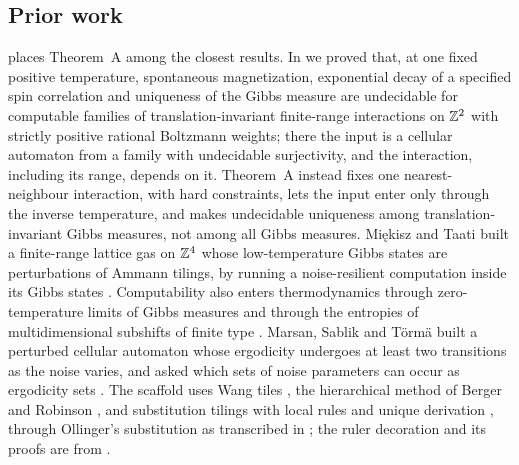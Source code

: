 \subsection{Prior work}

 places Theorem~A among the closest results. In \cite{DM26thermal} we proved that, at one fixed positive temperature, spontaneous magnetization, exponential decay of a specified spin correlation and uniqueness of the Gibbs measure are undecidable for computable families of translation-invariant finite-range interactions on $\mathbb{Z}^2$ with strictly positive rational Boltzmann weights; there the input is a cellular automaton from a family with undecidable surjectivity, and the interaction, including its range, depends on it. Theorem~A instead fixes one nearest-neighbour interaction, with hard constraints, lets the input enter only through the inverse temperature, and makes undecidable uniqueness among translation-invariant Gibbs measures, not among all Gibbs measures. Mi\k{e}kisz and Taati built a finite-range lattice gas on $\mathbb{Z}^4$ whose low-temperature Gibbs states are perturbations of Ammann tilings, by running a noise-resilient computation inside its Gibbs states \cite{TaatiMiekisz26}. Computability also enters thermodynamics through zero-temperature limits of Gibbs measures \cite{ChazottesHochman10} and through the entropies of multidimensional subshifts of finite type \cite{HochmanMeyerovitch10}. Marsan, Sablik and T\"orm\"a built a perturbed cellular automaton whose ergodicity undergoes at least two transitions as the noise varies, and asked which sets of noise parameters can occur as ergodicity sets \cite{MarsanSablikTorma26}. The scaffold uses Wang tiles \cite{Wang61}, the hierarchical method of Berger \cite{Berger66} and Robinson \cite{Robinson71}, and substitution tilings with local rules and unique derivation \cite{Mozes89,Mosse92,Solomyak98}, through Ollinger's substitution \cite{Ollinger08} as transcribed in \cite{LeanWang}; the ruler decoration and its proofs are from \cite{DM26forget}.

